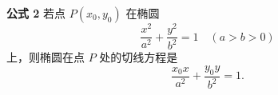 \documentclass[12pt]{ctexart}
\begin{document}
\noindent
\textbf{公式 2}\quad
若点 $P(x_0,y_0)$ 在椭圆
\[
\frac{x^2}{a^2}+\frac{y^2}{b^2}=1 \quad (a>b>0)
\]
上，则椭圆在点 $P$ 处的切线方程是
\[
\frac{x_0x}{a^2}+\frac{y_0y}{b^2}=1.
\]
\end{document}
